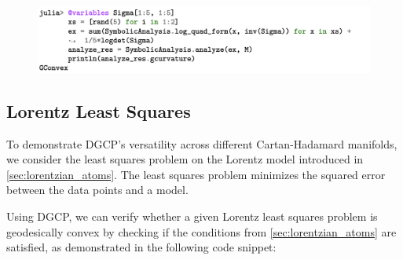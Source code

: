 \documentclass[twoside,11pt]{article}
\begin{document}
\begin{figure}[h!]
    \centering
    \includegraphics[width=\linewidth]{listing/7.png}
\end{figure}

\newpage

\subsection{Lorentz Least Squares}

To demonstrate DGCP's versatility across different Cartan-Hadamard manifolds, we consider the least squares problem on the Lorentz model introduced in \ref{sec:lorentzian_atoms}. The least squares problem minimizes the squared error between the data points and a model.

Using DGCP, we can verify whether a given Lorentz least squares problem is geodesically convex by checking if the conditions from \ref{sec:lorentzian_atoms} are satisfied, as demonstrated in the following code snippet:





\end{document}
